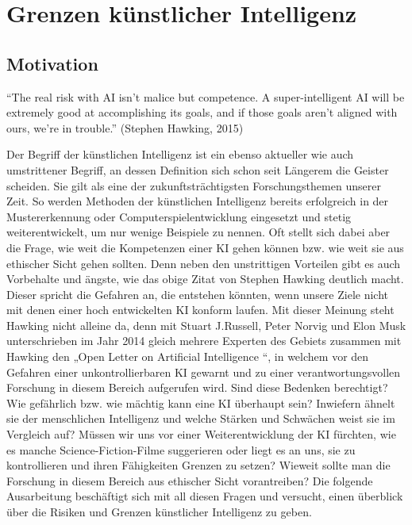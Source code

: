
\chapter{Grenzen künstlicher Intelligenz}
\section{Motivation}
“The real risk with AI isn’t malice but competence.
A super-intelligent AI will be extremely good at accomplishing its goals, and if those goals aren’t aligned with ours, we’re in trouble.” (Stephen Hawking, 2015)

Der Begriff der künstlichen Intelligenz ist ein ebenso aktueller wie auch umstrittener Begriff, an dessen Definition sich schon seit Längerem die Geister scheiden.
Sie gilt als eine der zukunftsträchtigsten Forschungsthemen unserer Zeit.
So werden Methoden der künstlichen Intelligenz bereits erfolgreich in der Mustererkennung oder Computerspielentwicklung eingesetzt und stetig weiterentwickelt, um nur wenige Beispiele zu nennen.
Oft stellt sich dabei aber die Frage, wie weit die Kompetenzen einer KI gehen können bzw.
wie weit sie aus ethischer Sicht gehen sollten.
Denn neben den unstrittigen Vorteilen gibt es auch Vorbehalte und ängste, wie das obige Zitat von Stephen Hawking deutlich macht.
Dieser spricht die Gefahren an, die entstehen könnten, wenn unsere Ziele nicht mit denen einer hoch entwickelten KI konform laufen.
Mit dieser Meinung steht Hawking nicht alleine da, denn mit Stuart J.Russell, Peter Norvig und Elon Musk unterschrieben im Jahr 2014 gleich mehrere Experten des Gebiets zusammen mit Hawking den „Open Letter on Artificial Intelligence “, in welchem vor den Gefahren einer unkontrollierbaren KI gewarnt und zu einer verantwortungsvollen Forschung in diesem Bereich aufgerufen wird.
Sind diese Bedenken berechtigt? Wie gefährlich bzw.
wie mächtig kann eine KI überhaupt sein? Inwiefern ähnelt sie der menschlichen Intelligenz und welche Stärken und Schwächen weist sie im Vergleich auf? Müssen wir uns vor einer Weiterentwicklung der KI fürchten, wie es manche Science-Fiction-Filme suggerieren oder liegt es an uns, sie zu kontrollieren und ihren Fähigkeiten Grenzen zu setzen?
Wieweit sollte man die Forschung in diesem Bereich aus ethischer Sicht vorantreiben?
Die folgende Ausarbeitung beschäftigt sich mit all diesen Fragen und versucht, einen überblick über die Risiken und Grenzen künstlicher Intelligenz zu geben.

